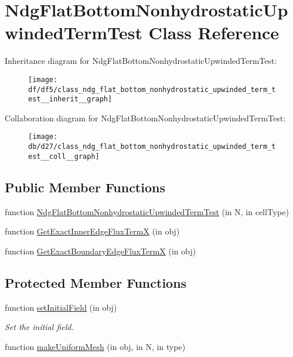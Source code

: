 \hypertarget{class_ndg_flat_bottom_nonhydrostatic_upwinded_term_test}{}\section{Ndg\+Flat\+Bottom\+Nonhydrostatic\+Upwinded\+Term\+Test Class Reference}
\label{class_ndg_flat_bottom_nonhydrostatic_upwinded_term_test}


Inheritance diagram for Ndg\+Flat\+Bottom\+Nonhydrostatic\+Upwinded\+Term\+Test\+:
\nopagebreak
\begin{figure}[H]
\begin{center}
\leavevmode
\texttt{[image: df/df5/class\_ndg\_flat\_bottom\_nonhydrostatic\_upwinded\_term\_test\_\_inherit\_\_graph]}
\end{center}
\end{figure}


Collaboration diagram for Ndg\+Flat\+Bottom\+Nonhydrostatic\+Upwinded\+Term\+Test\+:
\nopagebreak
\begin{figure}[H]
\begin{center}
\leavevmode
\texttt{[image: db/d27/class\_ndg\_flat\_bottom\_nonhydrostatic\_upwinded\_term\_test\_\_coll\_\_graph]}
\end{center}
\end{figure}
\subsection*{Public Member Functions}
\begin{DoxyCompactItemize}
\item 
function \hyperlink{class_ndg_flat_bottom_nonhydrostatic_upwinded_term_test_af7f60d80c3870a8ea950048ff5aeebe1}{Ndg\+Flat\+Bottom\+Nonhydrostatic\+Upwinded\+Term\+Test} (in N, in cell\+Type)
\item 
function \hyperlink{class_ndg_flat_bottom_nonhydrostatic_upwinded_term_test_ac4740a074b37e3174e41983b828f73fc}{Get\+Exact\+Inner\+Edge\+Flux\+TermX} (in obj)
\item 
function \hyperlink{class_ndg_flat_bottom_nonhydrostatic_upwinded_term_test_a2589f074e66be3a98f52057e6e211230}{Get\+Exact\+Boundary\+Edge\+Flux\+TermX} (in obj)
\end{DoxyCompactItemize}
\subsection*{Protected Member Functions}
\begin{DoxyCompactItemize}
\item 
function \hyperlink{class_ndg_flat_bottom_nonhydrostatic_upwinded_term_test_a9f99b016013940241d92a9365f3fbbff}{set\+Initial\+Field} (in obj)
\begin{DoxyCompactList}\small\item\em Set the initial field. \end{DoxyCompactList}\item 
function \hyperlink{class_ndg_flat_bottom_nonhydrostatic_upwinded_term_test_abfedd5d6614993bb14464cba11e6d07a}{make\+Uniform\+Mesh} (in obj, in N, in type)
\end{DoxyCompactItemize}
